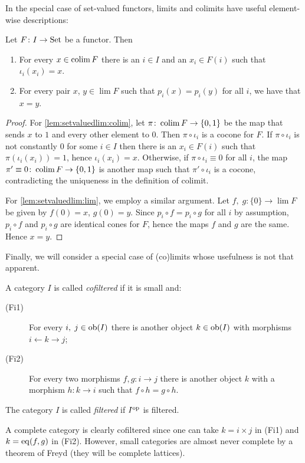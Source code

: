 \documentclass[a4paper,openany]{scrbook}
\begin{document}
In the special case of set-valued functors, limits and colimits have useful element-wise descriptions:
\begin{lemma}\label{lem:setvaluedlim}
Let $F\colon I \to \operatorname{Set}$ be a functor. Then
\begin{enumerate}
\item For every $x \in \operatorname*{colim} F$ there is an $i \in I$ and an $x_i \in F(i)$ such that $\iota_i(x_i) = x$.\label{lem:setvaluedlim:colim}
\item For every pair $x$, $y \in \lim F$ such that $p_i(x) = p_i(y)$ for all $i$, we have that $x=y$.\label{lem:setvaluedlim:lim}
\end{enumerate}
\end{lemma}
\begin{proof}
For \eqref{lem:setvaluedlim:colim}, let $\pi\colon \operatorname*{colim} F \to \{0,1\}$ be the map that sends $x$ to $1$ and every other element to $0$. Then $\pi \circ \iota_i$ is a cocone for $F$. If $\pi \circ \iota_i$ is not constantly $0$ for some $i \in I$ then there is an $x_i \in F(i)$ such that $\pi(\iota_i(x_i))=1$, hence $\iota_i(x_i) = x$. Otherwise, if $\pi \circ \iota_i \equiv 0$ for all $i$, the map $\pi' \equiv 0\colon \operatorname*{colim} F \to \{0,1\}$ is another map such that $\pi' \circ \iota_i$ is a cocone, contradicting the uniqueness in the definition of colimit.

For \eqref{lem:setvaluedlim:lim}, we employ a similar argument. Let $f,\;g \colon \{0\} \to \lim F$ be given by $f(0) = x$, $g(0) = y$. Since $p_i \circ f = p_i \circ g$ for all $i$ by assumption, $p_i \circ f$ and $p_i \circ g$ are identical cones for $F$, hence the maps $f$ and $g$ are the same. Hence $x=y$.
\end{proof}

Finally, we will consider a special case of (co)limits whose usefulness is not that apparent.

\begin{defn}
A category $I$ is called \emph{cofiltered} if it is small and:
\begin{description}
\item[(Fi1)] For every $i,\;j \in \operatorname{ob}(I)$ there is another object $k \in \operatorname{ob}(I)$ with morphisms $i \leftarrow k \to j$;
\item[(Fi2)] For every two morphisms $f,g\colon i \to j$ there is another object $k$ with a morphism $h\colon k \to i$ such that $f \circ h = g \circ h$.
\end{description}
The category $I$ is called \emph{filtered} if $I^{\operatorname{op}}$ is filtered.
\end{defn}
A complete category is clearly cofiltered since one can take $k = i \times j$ in (Fi1) and $k = \operatorname{eq}(f,g)$ in (Fi2). However, small categories are almost never complete by a theorem of Freyd (they will be complete lattices).
\end{document}
